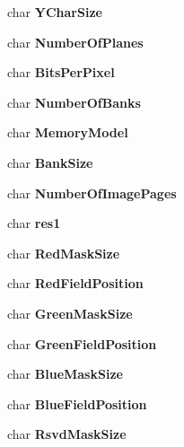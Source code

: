 \begin{DoxyCompactItemize}
\item 
char {\bfseries Y\-Char\-Size}\label{structVBE__modeInfo_a5137752f5a5543d847e34bfb5d650384}

\item 
char {\bfseries Number\-Of\-Planes}\label{structVBE__modeInfo_a2dea63a6075ac6f625ab2cc5e3778b6f}

\item 
char {\bfseries Bits\-Per\-Pixel}\label{structVBE__modeInfo_ad66e18060153a4f55b54fa63a395c385}

\item 
char {\bfseries Number\-Of\-Banks}\label{structVBE__modeInfo_a421512bcc0b0ea43f737d9c95cebf090}

\item 
char {\bfseries Memory\-Model}\label{structVBE__modeInfo_ab02a855837fb57b242102b31a31de987}

\item 
char {\bfseries Bank\-Size}\label{structVBE__modeInfo_ad968d3ea378f08dfbfe4ccb84bf59aa9}

\item 
char {\bfseries Number\-Of\-Image\-Pages}\label{structVBE__modeInfo_a4f08503dc446b0146b1a2c8888fea6dd}

\item 
char {\bfseries res1}\label{structVBE__modeInfo_a3caf9e0a78e793e6c38ee76a78ebcbb0}

\item 
char {\bfseries Red\-Mask\-Size}\label{structVBE__modeInfo_a687fdded0673f7311553f7cd900d4d3e}

\item 
char {\bfseries Red\-Field\-Position}\label{structVBE__modeInfo_a749d7b6ef235f3de5a7a4cb0de2baa82}

\item 
char {\bfseries Green\-Mask\-Size}\label{structVBE__modeInfo_a69dde9a55578d5cac40d2e7d23c909d5}

\item 
char {\bfseries Green\-Field\-Position}\label{structVBE__modeInfo_a74ee89f5acc0c2f5543f12a7f83e89d7}

\item 
char {\bfseries Blue\-Mask\-Size}\label{structVBE__modeInfo_a76b28a666e17c811566f9f5cdd966b42}

\item 
char {\bfseries Blue\-Field\-Position}\label{structVBE__modeInfo_a7e923cf7bcc84d30978941661f92ac0b}

\item 
char {\bfseries Rsvd\-Mask\-Size}\label{structVBE__modeInfo_a8bd3816c045943410838e9db46074e37}


\end{DoxyCompactItemize}
